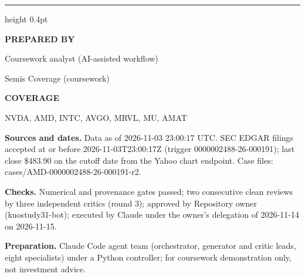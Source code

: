 \documentclass[a4paper,10pt]{article}
\newcommand{\DataDate}{2026-11-03 23:00:17 UTC}
\newcommand{\TeamName}{Semis Coverage (coursework)}
\newcommand{\ReportAuthor}{Coursework analyst (AI-assisted workflow)}
\newcommand{\Coverage}{NVDA, AMD, INTC, AVGO, MRVL, MU, AMAT}
\begin{document}
\par\vfill

{\color{MemoRule}\hrule height 0.4pt}\medskip
\begin{minipage}[t]{0.36\textwidth}
\vspace{0pt}\small
\setlength{\parskip}{3pt}
\textbf{PREPARED BY}\par\ReportAuthor\par\TeamName\par
\medskip\textbf{COVERAGE}\par\Coverage
\end{minipage}\hfill
\begin{minipage}[t]{0.60\textwidth}
\vspace{0pt}\footnotesize
\setlength{\parskip}{3pt}
\textbf{Sources and dates.} Data as of \DataDate.
SEC EDGAR filings accepted at or before 2026-11-03T23:00:17Z (trigger 0000002488-26-000191); last close \$483.90 on the cutoff date from the Yahoo chart endpoint. Case files: cases/AMD-0000002488-26-000191-r2.

\textbf{Checks.} Numerical and provenance gates passed; two consecutive clean reviews by three independent critics (round 3); approved by Repository owner (kuostudy31-bot); executed by Claude under the owner's delegation of 2026-11-14 on 2026-11-15.

\textbf{Preparation.} Claude Code agent team (orchestrator, generator and critic leads, eight specialists) under a Python controller; for coursework demonstration only, not investment advice.
\end{minipage}
\end{document}
